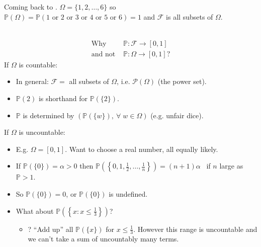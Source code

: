 \begin{example}
    Coming back to .
    $\Omega=\{1,2,\dots,6\}$ so \\
    $\mathbb{P}(\Omega) = \mathbb{P}(\text{1 or 2 or 3 or 4 or 5 or 6}) = 1$ and $\mathcal{F}$ is all subsets of $\Omega$.\\
\end{example} 

\begin{question} ~\vspace*{-1.5\baselineskip}
    \begin{align*}
        \text{Why } &\mathbb{P} : \mathcal{F} \to [0, 1] \\
        \text{and not } &\mathbb{P} : \Omega \to [0, 1]?
    \end{align*} 
    If $\Omega$ is countable:
    \begin{itemize}
        \item In general: $\mathcal{F} =$ all subsets of $\Omega$, i.e. $\mathcal{P}(\Omega)$ (the power set).
        \item $\mathbb{P}(2)$ is shorthand for $\mathbb{P}(\{2\})$.
        \item $\mathbb{P}$ is determined by $\left(\mathbb{P}(\{w\}),\ \forall \; w \in \Omega \right)$ (e.g. unfair dice). 
    \end{itemize} 

    If $\Omega$ is uncountable:
    \begin{itemize}
        \item E.g. $\Omega = [0, 1]$.
        Want to choose a real number, all equally likely.
        \item If $\mathbb{P}\left(\{0\}\right) = \alpha > 0$ then $\mathbb{P}\left(\left\{0, 1, \frac{1}{2}, \dots, \frac{1}{n}\right\}\right) = (n + 1)\alpha$ \Lightning \ if $n$ large as $\mathbb{P} > 1$.
        \item So $\mathbb{P}(\{0\}) = 0$, or $\mathbb{P}(\{0\})$ is undefined.
        \item What about $\mathbb{P}\left(\left\{x : x \leq \frac{1}{3}\right\}\right)$?
        \begin{itemize}
            \item ? ``Add up'' all $\mathbb{P}(\{x\})$ for $x \leq \frac{1}{3}$. However this range is uncountable and we can't take a sum of uncountably many terms.
        \end{itemize}  
    \end{itemize} 
\end{question}

